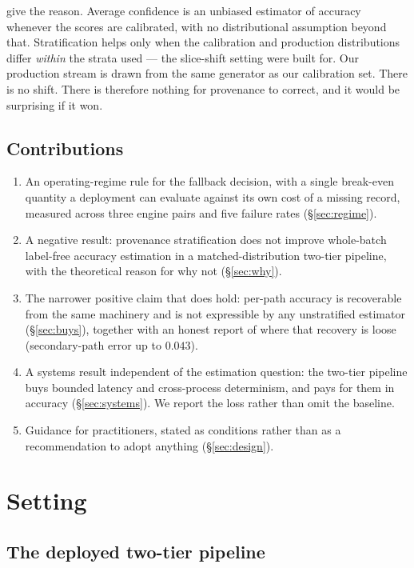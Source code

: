 \documentclass[11pt,a4paper]{article}
\begin{document}
\citet{kivimaki2025confidence} give the reason. Average confidence is an unbiased
estimator of accuracy whenever the scores are calibrated, with no distributional
assumption beyond that. Stratification helps only when the calibration and
production distributions differ \emph{within} the strata used --- the slice-shift
setting \citet{chen2021mandoline} were built for. Our production stream is drawn
from the same generator as our calibration set. There is no shift. There is
therefore nothing for provenance to correct, and it would be surprising if it won.

\subsection{Contributions}

\begin{enumerate}
\item An operating-regime rule for the fallback decision, with a single
break-even quantity a deployment can evaluate against its own cost of a missing
record, measured across three engine pairs and five failure rates
(\S\ref{sec:regime}).
\item A negative result: provenance stratification does not improve whole-batch
label-free accuracy estimation in a matched-distribution two-tier pipeline, with
the theoretical reason for why not (\S\ref{sec:why}).
\item The narrower positive claim that does hold: per-path accuracy is recoverable
from the same machinery and is not expressible by any unstratified estimator
(\S\ref{sec:buys}), together with an honest report of where that recovery is loose
(secondary-path error up to $0.043$).
\item A systems result independent of the estimation question: the two-tier
pipeline buys bounded latency and cross-process determinism, and pays for them in
accuracy (\S\ref{sec:systems}). We report the loss rather than omit the baseline.
\item Guidance for practitioners, stated as conditions rather than as a
recommendation to adopt anything (\S\ref{sec:design}).
\end{enumerate}

\section{Setting}

\subsection{The deployed two-tier pipeline}
\end{document}
